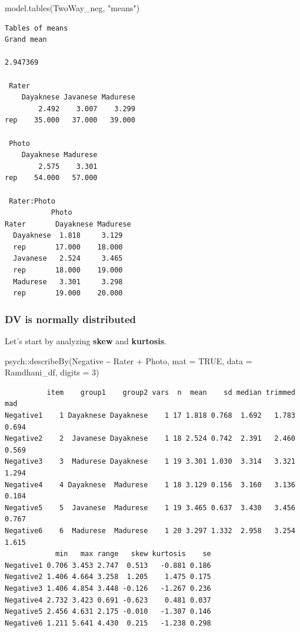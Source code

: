 \documentclass[
  11pt,
]{book}
\newenvironment{Shaded}{\begin{snugshade}}{\end{snugshade}}
\newcommand{\AttributeTok}[1]{\textcolor[rgb]{0.77,0.63,0.00}{#1}}
\newcommand{\ConstantTok}[1]{\textcolor[rgb]{0.00,0.00,0.00}{#1}}
\newcommand{\DecValTok}[1]{\textcolor[rgb]{0.00,0.00,0.81}{#1}}
\newcommand{\FunctionTok}[1]{\textcolor[rgb]{0.00,0.00,0.00}{#1}}
\newcommand{\NormalTok}[1]{#1}
\newcommand{\SpecialCharTok}[1]{\textcolor[rgb]{0.00,0.00,0.00}{#1}}
\newcommand{\StringTok}[1]{\textcolor[rgb]{0.31,0.60,0.02}{#1}}
\begin{document}
\begin{Shaded}
\begin{Highlighting}[]
\FunctionTok{model.tables}\NormalTok{(TwoWay\_neg, }\StringTok{"means"}\NormalTok{)}
\end{Highlighting}
\end{Shaded}

\begin{verbatim}
Tables of means
Grand mean
         
2.947369 

 Rater 
    Dayaknese Javanese Madurese
        2.492    3.007    3.299
rep    35.000   37.000   39.000

 Photo 
    Dayaknese Madurese
        2.575    3.301
rep    54.000   57.000

 Rater:Photo 
           Photo
Rater       Dayaknese Madurese
  Dayaknese  1.818     3.129  
  rep       17.000    18.000  
  Javanese   2.524     3.465  
  rep       18.000    19.000  
  Madurese   3.301     3.298  
  rep       19.000    20.000  
\end{verbatim}

\hypertarget{dv-is-normally-distributed}{%
\subsubsection{DV is normally distributed}\label{dv-is-normally-distributed}}

Let's start by analyzing \textbf{skew} and \textbf{kurtosis}.

\begin{Shaded}
\begin{Highlighting}[]
\NormalTok{psych}\SpecialCharTok{::}\FunctionTok{describeBy}\NormalTok{(Negative }\SpecialCharTok{\textasciitilde{}}\NormalTok{ Rater }\SpecialCharTok{+}\NormalTok{ Photo, }\AttributeTok{mat =} \ConstantTok{TRUE}\NormalTok{, }\AttributeTok{data =}\NormalTok{ Ramdhani\_df,}
    \AttributeTok{digits =} \DecValTok{3}\NormalTok{)}
\end{Highlighting}
\end{Shaded}

\begin{verbatim}
          item    group1    group2 vars  n  mean    sd median trimmed   mad
Negative1    1 Dayaknese Dayaknese    1 17 1.818 0.768  1.692   1.783 0.694
Negative2    2  Javanese Dayaknese    1 18 2.524 0.742  2.391   2.460 0.569
Negative3    3  Madurese Dayaknese    1 19 3.301 1.030  3.314   3.321 1.294
Negative4    4 Dayaknese  Madurese    1 18 3.129 0.156  3.160   3.136 0.104
Negative5    5  Javanese  Madurese    1 19 3.465 0.637  3.430   3.456 0.767
Negative6    6  Madurese  Madurese    1 20 3.297 1.332  2.958   3.254 1.615
            min   max range   skew kurtosis    se
Negative1 0.706 3.453 2.747  0.513   -0.881 0.186
Negative2 1.406 4.664 3.258  1.205    1.475 0.175
Negative3 1.406 4.854 3.448 -0.126   -1.267 0.236
Negative4 2.732 3.423 0.691 -0.623    0.481 0.037
Negative5 2.456 4.631 2.175 -0.010   -1.307 0.146
Negative6 1.211 5.641 4.430  0.215   -1.238 0.298
\end{verbatim}
\end{document}
